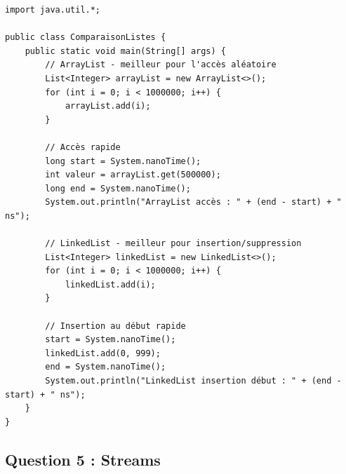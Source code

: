\documentclass[11pt,a4paper]{article}
\begin{document}
\begin{correctionbox}
\begin{lstlisting}
import java.util.*;

public class ComparaisonListes {
    public static void main(String[] args) {
        // ArrayList - meilleur pour l'accès aléatoire
        List<Integer> arrayList = new ArrayList<>();
        for (int i = 0; i < 1000000; i++) {
            arrayList.add(i);
        }
        
        // Accès rapide
        long start = System.nanoTime();
        int valeur = arrayList.get(500000);
        long end = System.nanoTime();
        System.out.println("ArrayList accès : " + (end - start) + " ns");
        
        // LinkedList - meilleur pour insertion/suppression
        List<Integer> linkedList = new LinkedList<>();
        for (int i = 0; i < 1000000; i++) {
            linkedList.add(i);
        }
        
        // Insertion au début rapide
        start = System.nanoTime();
        linkedList.add(0, 999);
        end = System.nanoTime();
        System.out.println("LinkedList insertion début : " + (end - start) + " ns");
    }
}
\end{lstlisting}
\end{correctionbox}

\subsection{Question 5 : Streams}
\end{document}
